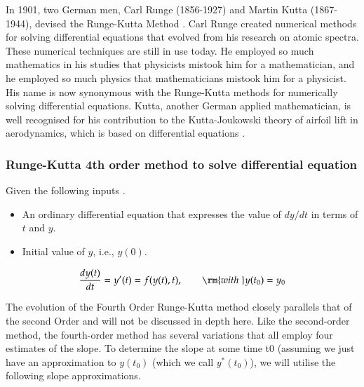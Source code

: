In 1901, two German men, Carl Runge (1856-1927) and Martin Kutta (1867-1944), devised the Runge-Kutta Method \cite{tobies2012iris}. Carl Runge created numerical methods for solving differential equations that evolved from his research on atomic spectra. These numerical techniques are still in use today. He employed so much mathematics in his studies that physicists mistook him for a mathematician, and he employed so much physics that mathematicians mistook him for a physicist. His name is now synonymous with the Runge-Kutta methods for numerically solving differential equations. Kutta, another German applied mathematician, is well recognised for his contribution to the Kutta-Joukowski theory of airfoil lift in aerodynamics, which is based on differential equations \cite{trefethen2015invented}. 


\subsubsection{Runge-Kutta 4th order method to solve differential equation}

Given the following inputs \cite{rungekutta_2023_webpage}. 

\begin{itemize}
    \item An ordinary differential equation that expresses the value of $dy/dt$ in terms of $t$ and $y$.
    \item Initial value of $y$, i.e., $y(0)$. 
\end{itemize}

\begin{equation}
    {{dy(t)} \over {dt}} = y'(t) = f(y(t),t), \quad \quad {\rm{with\;}} y(t_0)=y_0
\end{equation}

The evolution of the Fourth Order Runge-Kutta method closely parallels that of the second Order and will not be discussed in depth here. Like the second-order method, the fourth-order method has several variations that all employ four estimates of the slope. To determine the slope at some time t0 (assuming we just have an approximation to $y(t_0)$ (which we call $y^*(t_0)$), we will utilise the following slope approximations.

